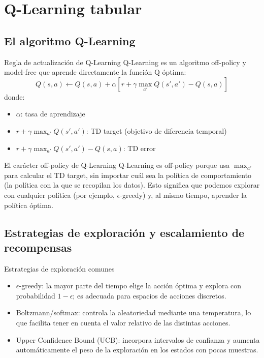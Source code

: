 \section{Q-Learning tabular}

\subsection{El algoritmo Q-Learning}

\begin{importantbox}{Regla de actualización de Q-Learning}
Q-Learning es un algoritmo off-policy y model-free que aprende directamente la función Q óptima:
$$Q(s, a) \leftarrow Q(s, a) + \alpha \left[r + \gamma \max_{a'} Q(s', a') - Q(s, a)\right]$$
donde:
\begin{itemize}
    \item $\alpha$: tasa de aprendizaje
    \item $r + \gamma \max_{a'} Q(s', a')$: TD target (objetivo de diferencia temporal)
    \item $r + \gamma \max_{a'} Q(s', a') - Q(s, a)$: TD error
\end{itemize}
\end{importantbox}

\begin{knowledgebox}{El carácter off-policy de Q-Learning}
Q-Learning es off-policy porque usa $\max_{a'}$ para calcular el TD target, sin importar cuál sea la política de comportamiento (la política con la que se recopilan los datos). Esto significa que podemos explorar con cualquier política (por ejemplo, $\epsilon$-greedy) y, al mismo tiempo, aprender la política óptima.
\end{knowledgebox}

\subsection{Estrategias de exploración y escalamiento de recompensas}

\begin{knowledgebox}{Estrategias de exploración comunes}
\begin{itemize}
    \item $\epsilon$-greedy: la mayor parte del tiempo elige la acción óptima y explora con probabilidad $1-\epsilon$; es adecuada para espacios de acciones discretos.
    \item Boltzmann/softmax: controla la aleatoriedad mediante una temperatura, lo que facilita tener en cuenta el valor relativo de las distintas acciones.
    \item Upper Confidence Bound (UCB): incorpora intervalos de confianza y aumenta automáticamente el peso de la exploración en los estados con pocas muestras.
\end{itemize}
\end{knowledgebox}

